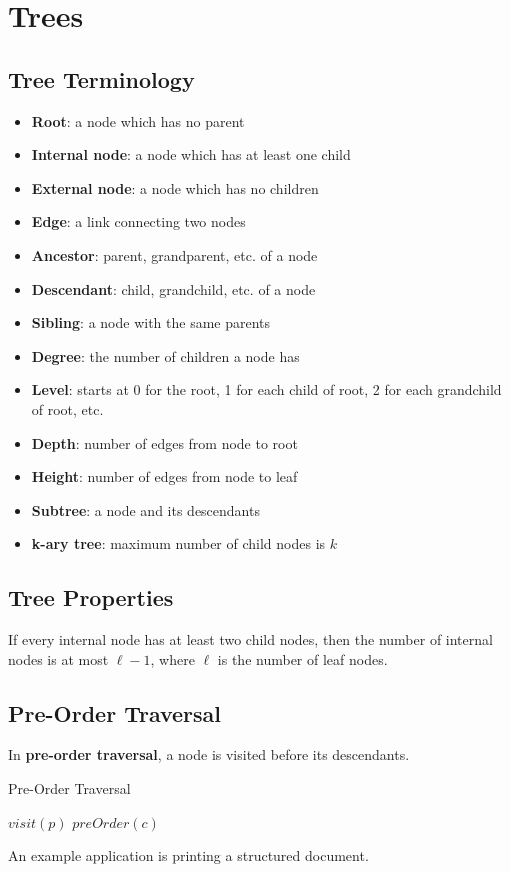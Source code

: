 \documentclass[12pt]{extarticle}
\begin{document}
	\section{Trees}
	\subsection{Tree Terminology}
	\begin{itemize}
		\item \textbf{Root}: a node which has no parent
		\item \textbf{Internal node}: a node which has at least one child
		\item \textbf{External node}: a node which has no children
		\item \textbf{Edge}: a link connecting two nodes
		\item \textbf{Ancestor}: parent, grandparent, etc. of a node
		\item \textbf{Descendant}: child, grandchild, etc. of a node
		\item \textbf{Sibling}: a node with the same parents
		\item \textbf{Degree}: the number of children a node has
		\item \textbf{Level}: starts at 0 for the root, 1 for each child of root, 2 for each grandchild of root, etc.
		\item \textbf{Depth}: number of edges from node to root
		\item \textbf{Height}: number of edges from node to leaf
		\item \textbf{Subtree}: a node and its descendants
		\item \textbf{k-ary tree}: maximum number of child nodes is $k$
	\end{itemize}
	\subsection{Tree Properties}
	If every internal node has at least two child nodes, then the number of internal nodes is at most $\ell-1$, where $\ell$ is the number of leaf nodes.
	\subsection{Pre-Order Traversal}
	In \textbf{pre-order traversal}, a node is visited before its descendants.
	\begin{algorithm}
		\caption{Pre-Order Traversal}
		\begin{algorithmic}[1]
			\State $\textit{visit}(p)$
				\State $\textit{preOrder}(c)$
			\EndFor
			\EndProcedure
		\end{algorithmic}
	\end{algorithm}
	\newline An example application is printing a structured document.
	\newpage
\end{document}

